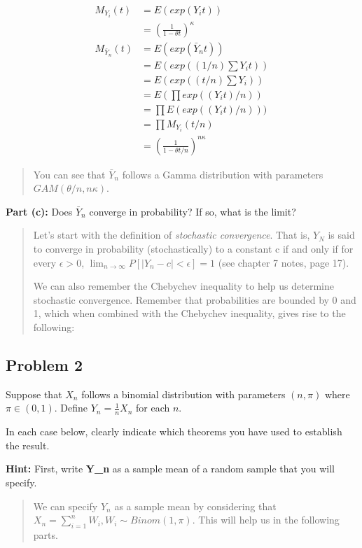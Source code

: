 \documentclass[
]{article}
\begin{document}
\begin{align*}
M_{Y_i}(t) &= E(exp(Y_it))\\
&= (\frac{1}{1 - \theta t})^{\kappa}\\
M_{\bar{Y}_n}(t) &= E(exp(\bar{Y}_n t))\\
&= E(exp((1/n)\sum Y_i t))\\
&= E(exp((t/n)\sum Y_i))\\
&= E(\prod exp((Y_i t)/n))\\
&= \prod E(exp((Y_i t)/n)))\\
&= \prod M_{Y_i}(t/n)\\
&= (\frac{1}{1 - \theta t/n})^{n\kappa}
\end{align*}

\begin{quote}
You can see that \(\bar{Y}_n\) follows a Gamma distribution with
parameters \(GAM(\theta/n, n\kappa)\).
\end{quote}

\textbf{Part (c):} Does \(\bar{Y}_n\) converge in probability? If so,
what is the limit?

\begin{quote}
Let's start with the definition of \emph{stochastic convergence}. That
is, \(Y_N\) is said to converge in probability (stochastically) to a
constant c if and only if for every \(\epsilon > 0\),
\(\lim_{n \to \infty} P[|Y_n- c| < \epsilon] = 1\) (see chapter 7 notes,
page 17).

We can also remember the Chebychev inequality to help us determine
stochastic convergence. Remember that probabilities are bounded by 0 and
1, which when combined with the Chebychev inequality, gives rise to the
following:
\end{quote}

\hypertarget{problem-2}{%
\subsection{Problem 2}\label{problem-2}}

Suppose that \(X_n\) follows a binomial distribution with parameters
\((n, \pi)\) where \(\pi \in (0,1)\). Define \(Y_n = \frac{1}{n}X_n\)
for each \(n\).

In each case below, clearly indicate which theorems you have used to
establish the result.

\textbf{Hint:} First, write \textbf{Y\_n} as a sample mean of a random
sample that you will specify.

\begin{quote}
We can specify \(Y_n\) as a sample mean by considering that
\(X_n = \sum_{i = 1}^{n} W_i, W_i \sim Binom(1, \pi)\). This will help
us in the following parts.
\end{quote}
\end{document}
